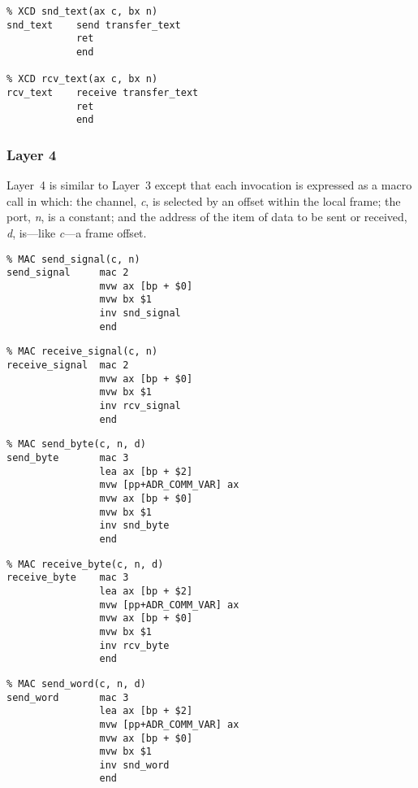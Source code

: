 {\small
\begin{verbatim}
% XCD snd_text(ax c, bx n)
snd_text    send transfer_text
            ret
            end

% XCD rcv_text(ax c, bx n)
rcv_text    receive transfer_text
            ret
            end
\end{verbatim}}




\subsubsection{Layer 4}
Layer~4 is similar to Layer~3 except that each invocation is expressed as a macro call in which: the channel, \emph{c}, is selected by an offset within the local frame; the port, \emph{n}, is a constant; and the address of the item of data to be sent or received, \emph{d}, is---like \emph{c}---a frame offset.

{\small
\begin{verbatim}
% MAC send_signal(c, n)
send_signal     mac 2
                mvw ax [bp + $0]
                mvw bx $1
                inv snd_signal
                end
\end{verbatim}}

{\small
\begin{verbatim}
% MAC receive_signal(c, n)
receive_signal  mac 2
                mvw ax [bp + $0]
                mvw bx $1
                inv rcv_signal
                end
\end{verbatim}}

{\small
\begin{verbatim}
% MAC send_byte(c, n, d)
send_byte       mac 3
                lea ax [bp + $2]
                mvw [pp+ADR_COMM_VAR] ax
                mvw ax [bp + $0]
                mvw bx $1
                inv snd_byte
                end
\end{verbatim}}

{\small
\begin{verbatim}
% MAC receive_byte(c, n, d)
receive_byte    mac 3
                lea ax [bp + $2]
                mvw [pp+ADR_COMM_VAR] ax
                mvw ax [bp + $0]
                mvw bx $1
                inv rcv_byte
                end
\end{verbatim}}

{\small
\begin{verbatim}
% MAC send_word(c, n, d)
send_word       mac 3
                lea ax [bp + $2]
                mvw [pp+ADR_COMM_VAR] ax
                mvw ax [bp + $0]
                mvw bx $1
                inv snd_word
                end
\end{verbatim}}


